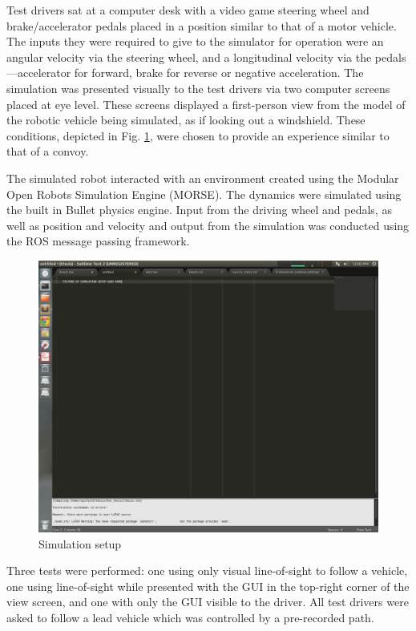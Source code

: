 \documentclass[12pt]{report}
\begin{document}
Test drivers sat at a computer desk with a video game steering wheel and brake/accelerator pedals placed in a position similar to that of a motor vehicle. The inputs they were required to give to the simulator for operation were an angular velocity via the steering wheel, and a longitudinal velocity via the pedals---accelerator for forward, brake for reverse or negative acceleration. The simulation was presented visually to the test drivers via two computer screens placed at eye level. These screens displayed a first-person view from the model of the robotic vehicle being simulated, as if looking out a windshield. These conditions, depicted in Fig. \ref{fig:simsetup}, were chosen to provide an experience similar to that of a convoy. 

The simulated robot interacted with an environment created using the Modular Open Robots Simulation Engine (MORSE). The dynamics were simulated using the built in Bullet physics engine. Input from the driving wheel and pedals, as well as position and velocity and output from the simulation was conducted using the ROS message passing framework.

\begin{figure}[ht] \centering
    \includegraphics[width=6.5in]{./figs/sim_setup.png}
    \caption{Simulation setup}
    \label{fig:simsetup}
\end{figure}

Three tests were performed: one using only visual line-of-sight to follow a vehicle, one using line-of-sight while presented with the GUI in the top-right corner of the view screen, and one with only the GUI visible to the driver. All test drivers were asked to follow a lead vehicle which was controlled by a pre-recorded path.
\end{document}
